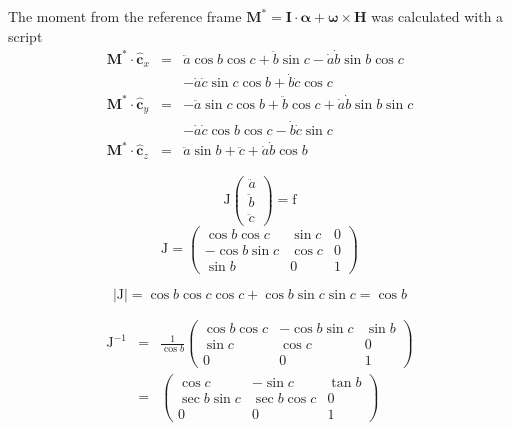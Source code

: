 \documentclass[lettersize,journal]{IEEEtran}
\begin{document}
The moment from the reference frame $\mathbf{M}^* = \mathbf{I}\cdot \boldsymbol\alpha + \boldsymbol\omega\times \mathbf{H}$ was calculated with a script
\begin{eqnarray}
  \mathbf{M}^* \cdot \mathbf{\hat{c}}_x &=& \ddot{a}\cos b\cos c + \ddot{b}\sin c- \dot{a}\dot{b}\sin b\cos c\nonumber\\
  &&- \dot{a}\dot{c}\sin c\cos b + \dot{b}\dot{c}\cos c\\
  \mathbf{M}^* \cdot \mathbf{\hat{c}}_y &=& - \ddot{a}\sin c\cos b + \ddot{b}\cos c+\dot{a}\dot{b}\sin b\sin c\nonumber\\
  &&- \dot{a}\dot{c}\cos b\cos c - \dot{b}\dot{c}\sin c \\
  \mathbf{M}^* \cdot \mathbf{\hat{c}}_z &=& \ddot{a} \sin b + \ddot{c} +\dot{a} \dot{b} \cos b
\end{eqnarray}

\begin{equation}
  \mathrm{J}
  \begin{pmatrix}
    \ddot{a}\\
    \ddot{b}\\
    \ddot{c}
  \end{pmatrix} = \mathrm{f}
\end{equation}
\begin{equation}
  \mathrm{J} = 
  \begin{pmatrix}
    \cos b \cos c & \sin c & 0 \\
    - \cos b \sin c & \cos c & 0 \\
    \sin b & 0 & 1
  \end{pmatrix}
\end{equation}

\begin{equation}
  \left|\mathrm{J}\right| = \cos b \cos c \cos c + \cos b \sin c \sin c = \cos b
\end{equation}

\begin{eqnarray}
  \mathrm{J}^{-1} &=& \frac{1}{\cos b}
  \begin{pmatrix}
    \cos b \cos c & -\cos b \sin c& \sin b \\
    \sin c & \cos c & 0 \\
    0 & 0 & 1
  \end{pmatrix}\nonumber\\
  &=&
  \begin{pmatrix}
    \cos c & -\sin c& \tan b \\
    \sec b\sin c & \sec b\cos c & 0 \\
    0 & 0 & 1
  \end{pmatrix}
\end{eqnarray}
\end{document}
